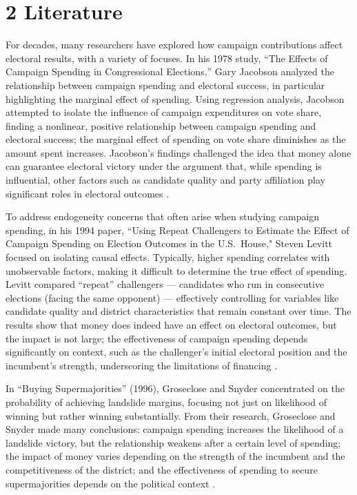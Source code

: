 \section*{2 Literature}

\indent For decades, many researchers have explored how campaign contributions affect electoral results, with a variety of focuses. In his 1978 study, ``The Effects of Campaign Spending in Congressional Elections,'' Gary Jacobson analyzed the relationship between campaign spending and electoral success, in particular highlighting the marginal effect of spending. Using regression analysis, Jacobson attempted to isolate the influence of campaign expenditures on vote share, finding a nonlinear, positive relationship between campaign spending and electoral success; the marginal effect of spending on vote share diminishes as the amount spent increases. Jacobson's findings challenged the idea that money alone can guarantee electoral victory under the argument that, while spending is influential, other factors such as candidate quality and party affiliation play significant roles in electoral outcomes \cite{jacobson1978}.

\indent To address endogeneity concerns that often arise when studying campaign spending, in his 1994 paper, ``Using Repeat Challengers to Estimate the Effect of Campaign Spending on Election Outcomes in the U.S.\ House," Steven Levitt focused on isolating causal effects. Typically, higher spending correlates with unobservable factors, making it difficult to determine the true effect of spending. Levitt compared ``repeat'' challengers --- candidates who run in consecutive elections (facing the same opponent) --- effectively controlling for variables like candidate quality and district characteristics that remain constant over time. The results show that money does indeed have an effect on electoral outcomes, but the impact is not large; the effectiveness of campaign spending depends significantly on context, such as the challenger's initial electoral position and the incumbent's strength, underscoring the limitations of financing \cite{levitt1994}.

\indent In ``Buying Supermajorities'' (1996), Groseclose and Snyder concentrated on the probability of achieving landslide margins, focusing not just on likelihood of winning but rather winning substantially. From their research, Groseclose and Snyder made many conclusions: campaign spending increases the likelihood of a landslide victory, but the relationship weakens after a certain level of spending; the impact of money varies depending on the strength of the incumbent and the competitiveness of the district; and the effectiveness of spending to secure supermajorities depends on the political context \cite{groseclose1996}.

